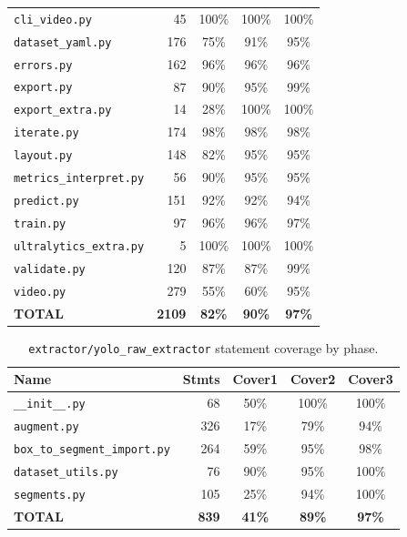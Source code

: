 {\begin{longtable}{@{}l r c c c@{}}
\texttt{cli\_video.py} & 45 & 100\% & 100\% & 100\% \\
\texttt{dataset\_yaml.py} & 176 & 75\% & 91\% & 95\% \\
\texttt{errors.py} & 162 & 96\% & 96\% & 96\% \\
\texttt{export.py} & 87 & 90\% & 95\% & 99\% \\
\texttt{export\_extra.py} & 14 & 28\% & 100\% & 100\% \\
\texttt{iterate.py} & 174 & 98\% & 98\% & 98\% \\
\texttt{layout.py} & 148 & 82\% & 95\% & 95\% \\
\texttt{metrics\_interpret.py} & 56 & 90\% & 95\% & 95\% \\
\texttt{predict.py} & 151 & 92\% & 92\% & 94\% \\
\texttt{train.py} & 97 & 96\% & 96\% & 97\% \\
\texttt{ultralytics\_extra.py} & 5 & 100\% & 100\% & 100\% \\
\texttt{validate.py} & 120 & 87\% & 87\% & 99\% \\
\texttt{video.py} & 279 & 55\% & 60\% & 95\% \\
\hline
\textbf{TOTAL} & \textbf{2109} & \textbf{82\%} & \textbf{90\%} & \textbf{97\%} \\
\end{longtable}
}

\vspace{0.6em}
{\scriptsize
\begin{longtable}{@{}l r c c c@{}}
\caption{\texttt{extractor/yolo\_raw\_extractor} statement coverage by phase.}
\label{tab:coverage_extractor} \\
\hline
\textbf{Name} & \textbf{Stmts} & \textbf{Cover1} & \textbf{Cover2} & \textbf{Cover3} \\
\hline
\texttt{\_\_init\_\_.py} & 68 & 50\% & 100\% & 100\% \\
\texttt{augment.py} & 326 & 17\% & 79\% & 94\% \\
\texttt{box\_to\_segment\_import.py} & 264 & 59\% & 95\% & 98\% \\
\texttt{dataset\_utils.py} & 76 & 90\% & 95\% & 100\% \\
\texttt{segments.py} & 105 & 25\% & 94\% & 100\% \\
\hline
\textbf{TOTAL} & \textbf{839} & \textbf{41\%} & \textbf{89\%} & \textbf{97\%} \\
\end{longtable}
}
